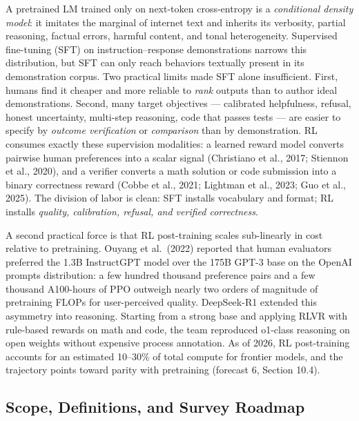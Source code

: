 A pretrained LM trained only on next-token cross-entropy is a \emph{conditional density model}: it imitates the marginal of internet text and inherits its verbosity, partial reasoning, factual errors, harmful content, and tonal heterogeneity. Supervised fine-tuning (SFT) on instruction--response demonstrations narrows this distribution, but SFT can only reach behaviors textually present in its demonstration corpus. Two practical limits made SFT alone insufficient. First, humans find it cheaper and more reliable to \emph{rank} outputs than to author ideal demonstrations. Second, many target objectives --- calibrated helpfulness, refusal, honest uncertainty, multi-step reasoning, code that passes tests --- are easier to specify by \emph{outcome verification} or \emph{comparison} than by demonstration. RL consumes exactly these supervision modalities: a learned reward model converts pairwise human preferences into a scalar signal (Christiano et al., 2017; Stiennon et al., 2020), and a verifier converts a math solution or code submission into a binary correctness reward (Cobbe et al., 2021; Lightman et al., 2023; Guo et al., 2025). The division of labor is clean: SFT installs vocabulary and format; RL installs \emph{quality, calibration, refusal, and verified correctness}.

A second practical force is that RL post-training scales sub-linearly in cost relative to pretraining. Ouyang et al.~(2022) reported that human evaluators preferred the 1.3B InstructGPT model over the 175B GPT-3 base on the OpenAI prompts distribution: a few hundred thousand preference pairs and a few thousand A100-hours of PPO outweigh nearly two orders of magnitude of pretraining FLOPs for user-perceived quality. DeepSeek-R1 extended this asymmetry into reasoning. Starting from a strong base and applying RLVR with rule-based rewards on math and code, the team reproduced o1-class reasoning on open weights without expensive process annotation. As of 2026, RL post-training accounts for an estimated 10--30\% of total compute for frontier models, and the trajectory points toward parity with pretraining (forecast 6, Section 10.4).

\subsection{Scope, Definitions, and Survey Roadmap}\label{scope-definitions-and-survey-roadmap}

